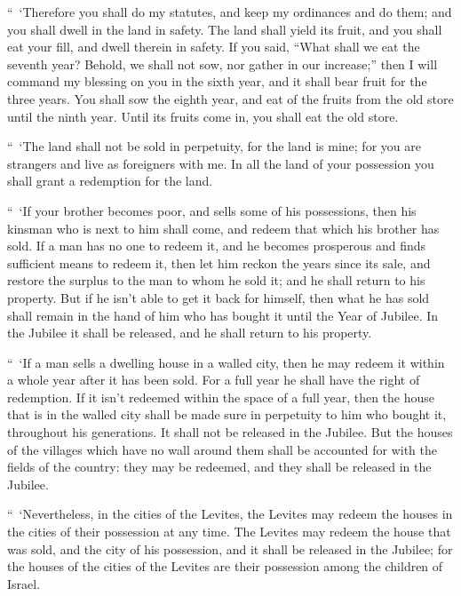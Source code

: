{\par }{\PP {}“ ‘Therefore you shall do my statutes, and keep my ordinances and do them; and you shall dwell in the land in safety.
The land shall yield its fruit, and you shall eat your fill, and dwell therein in safety.
If you said, “What shall we eat the seventh year? Behold, we shall not sow, nor gather in our increase;”
then I will command my blessing on you in the sixth year, and it shall bear fruit for the three years.
You shall sow the eighth year, and eat of the fruits from the old store until the ninth year. Until its fruits come in, you shall eat the old store.
\par }{\PP {}“ ‘The land shall not be sold in perpetuity, for the land is mine; for you are strangers and live as foreigners with me.
In all the land of your possession you shall grant a redemption for the land.
\par }{\PP {}“ ‘If your brother becomes poor, and sells some of his possessions, then his kinsman who is next to him shall come, and redeem that which his brother has sold.
If a man has no one to redeem it, and he becomes prosperous and finds sufficient means to redeem it,
then let him reckon the years since its sale, and restore the surplus to the man to whom he sold it; and he shall return to his property.
But if he isn’t able to get it back for himself, then what he has sold shall remain in the hand of him who has bought it until the Year of Jubilee. In the Jubilee it shall be released, and he shall return to his property.
\par }{\PP {}“ ‘If a man sells a dwelling house in a walled city, then he may redeem it within a whole year after it has been sold. For a full year he shall have the right of redemption.
If it isn’t redeemed within the space of a full year, then the house that is in the walled city shall be made sure in perpetuity to him who bought it, throughout his generations. It shall not be released in the Jubilee.
But the houses of the villages which have no wall around them shall be accounted for with the fields of the country: they may be redeemed, and they shall be released in the Jubilee.
\par }{\PP {}“ ‘Nevertheless, in the cities of the Levites, the Levites may redeem the houses in the cities of their possession at any time.
The Levites may redeem the house that was sold, and the city of his possession, and it shall be released in the Jubilee; for the houses of the cities of the Levites are their possession among the children of Israel.
}
